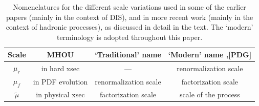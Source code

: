 \begin{table}[t!]
	\centering
	\renewcommand*{\arraystretch}{1.8}
	\begin{tabular}{|c|c|c|c|}
          \toprule
Scale & MHOU &`Traditional' name\cite{Altarelli:1988qr,Nason:1987xz,Close:1987ay,Martin:1990fq,Virchaux:1991jc} & `Modern' name \cite{vanNeerven:2000uj},[PDG]  \\
\midrule
    $\mu_r$& in hard xsec & --- & renormalization scale \\
    $\mu_f$ & in PDF evolution &renormalization scale & factorization scale  \\
      $\widetilde\mu$ & in physical xsec& factorization scale & scale of the process\\
\bottomrule
        \end{tabular}
        \vspace{0.3cm}
	\caption{\small Nomenclatures for the different scale variations used in 
some of the earlier papers (mainly in the context of DIS), and in more recent work (mainly in the context of hadronic processes), as discussed in detail in the text. The `modern' terminology is adopted throughout this paper.}
	\label{tab:scale_nomenclature}
\end{table}

